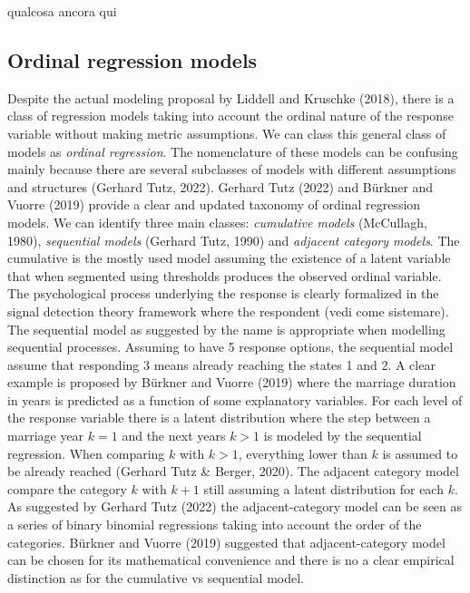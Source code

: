 \documentclass[
  man,floatsintext]{apa6}
\begin{document}
qualcosa ancora qui

\subsection{Ordinal regression models}\label{ordinal-regression-models}

Despite the actual modeling proposal by Liddell and Kruschke (2018), there is a class of regression models taking into account the ordinal nature of the response variable without making metric assumptions. We can class this general class of models as \emph{ordinal regression}. The nomenclature of these models can be confusing mainly because there are several subclasses of models with different assumptions and structures (Gerhard Tutz, 2022). Gerhard Tutz (2022) and Bürkner and Vuorre (2019) provide a clear and updated taxonomy of ordinal regression models. We can identify three main classes: \emph{cumulative models} (McCullagh, 1980), \emph{sequential models} (Gerhard Tutz, 1990) and \emph{adjacent category models}. The cumulative is the mostly used model assuming the existence of a latent variable that when segmented using thresholds produces the observed ordinal variable. The psychological process underlying the response is clearly formalized in the signal detection theory framework where the respondent (vedi come sistemare). The sequential model as suggested by the name is appropriate when modelling sequential processes. Assuming to have 5 response options, the sequential model assume that responding 3 means already reaching the states 1 and 2. A clear example is proposed by Bürkner and Vuorre (2019) where the marriage duration in years is predicted as a function of some explanatory variables. For each level of the response variable there is a latent distribution where the step between a marriage year \(k = 1\) and the next years \(k > 1\) is modeled by the sequential regression. When comparing \(k\) with \(k > 1\), everything lower than \(k\) is assumed to be already reached (Gerhard Tutz \& Berger, 2020). The adjacent category model compare the category \(k\) with \(k + 1\) still assuming a latent distribution for each \(k\). As suggested by Gerhard Tutz (2022) the adjacent-category model can be seen as a series of binary binomial regressions taking into account the order of the categories. Bürkner and Vuorre (2019) suggested that adjacent-category model can be chosen for its mathematical convenience and there is no a clear empirical distinction as for the cumulative vs sequential model.
\end{document}
